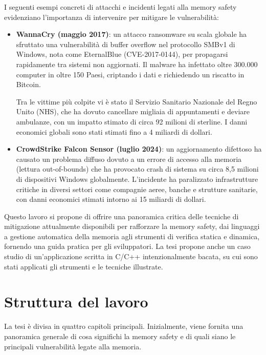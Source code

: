 I seguenti esempi concreti di attacchi e incidenti legati alla memory safety evidenziano
l'importanza di intervenire per mitigare le vulnerabilità:

\begin{itemize}
  \item \textbf{WannaCry (maggio 2017)}: un attacco ransomware su scala globale ha
    sfruttato una vulnerabilità di buffer overflow nel protocollo SMBv1 di Windows,
    nota come EternalBlue (CVE-2017-0144), per propagarsi rapidamente tra sistemi
    non aggiornati. Il malware ha infettato oltre 300.000 computer in oltre 150
    Paesi, criptando i dati e richiedendo un riscatto in Bitcoin.

    Tra le vittime più colpite vi è stato il Servizio Sanitario Nazionale del Regno
    Unito (NHS), che ha dovuto cancellare migliaia di appuntamenti e deviare
    ambulanze, con un impatto stimato di circa 92 milioni di sterline. I danni
    economici globali sono stati stimati fino a 4 miliardi di dollari.\cite{wannacry_kaspersky}

  \item \textbf{CrowdStrike Falcon Sensor (luglio 2024)}: un aggiornamento difettoso
    ha causato un problema diffuso dovuto a un errore di accesso alla memoria (lettura
    out-of-bounds) che ha provocato crash di sistema su circa 8,5 milioni di dispositivi
    Windows globalmente. L'incidente ha paralizzato infrastrutture critiche in
    diversi settori come compagnie aeree, banche e strutture sanitarie, con
    danni economici stimati intorno ai 15 miliardi di dollari.\cite{crowdstrike_bug_wired}\cite{crowdstrike_bug_wired_cost}
\end{itemize}

\noindent
Questo lavoro si propone di offrire una panoramica critica delle tecniche di
mitigazione attualmente disponibili per rafforzare la memory safety, dai linguaggi
a gestione automatica della memoria agli strumenti di verifica statica e dinamica,
fornendo una guida pratica per gli sviluppatori. La tesi propone anche un caso studio
di un'applicazione scritta in C/C++ intenzionalmente bacata, su cui sono stati
applicati gli strumenti e le tecniche illustrate.

\section{Struttura del lavoro}
La tesi è divisa in quattro capitoli principali. Inizialmente, viene fornita una
panoramica generale di cosa significhi la memory safety e di quali siano le
principali vulnerabilità legate alla memoria.


